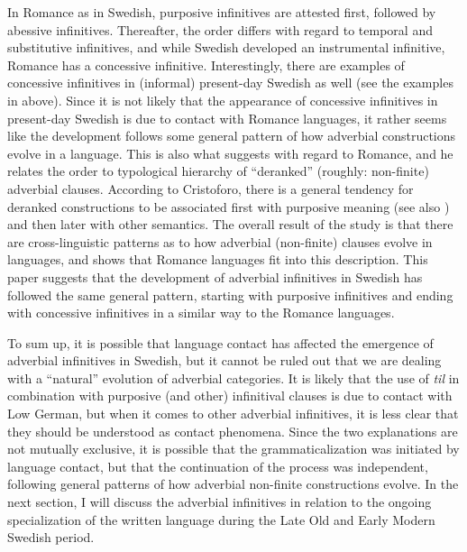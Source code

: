 \documentclass[output=paper]{langscibook}
\begin{document}
In Romance as in Swedish, purposive infinitives are attested first, followed by abessive infinitives. Thereafter, the order differs with regard to temporal and substitutive infinitives, and while Swedish developed an instrumental infinitive, Romance has a concessive infinitive. Interestingly, there are examples of concessive infinitives in (informal) present-day Swedish as well (see the examples in  above). Since it is not likely that the appearance of concessive infinitives in present-day Swedish is due to contact with Romance languages, it rather seems like the development follows some general pattern of how adverbial constructions evolve in a language. This is also what \citet{Schulte2007Prepositional, Schulte2007What} suggests with regard to Romance, and he relates the order to  typological hierarchy of “deranked” (roughly: non-finite) adverbial clauses. According to Cristoforo, there is a general tendency for deranked constructions to be associated first with purposive meaning (see also \citealt{Haspelmath1989}) and then later with other semantics. The overall result of the study is that there are cross-linguistic patterns as to how adverbial (non-finite) clauses evolve in languages, and \citet{Schulte2007Prepositional, Schulte2007What} shows that Romance languages fit into this description. This paper suggests that the development of adverbial infinitives in Swedish has followed the same general pattern, starting with purposive infinitives and ending with concessive infinitives in a similar way to the Romance languages.



To sum up, it is possible that language contact has affected the emergence of adverbial infinitives in Swedish, but it cannot be ruled out that we are dealing with a “natural” evolution of adverbial categories. It is likely that the use of \textit{til} in combination with purposive (and other) infinitival clauses is due to contact with Low German, but when it comes to other adverbial infinitives, it is less clear that they should be understood as contact phenomena. Since the two explanations are not mutually exclusive, it is possible that the grammaticalization was initiated by language contact, but that the continuation of the process was independent, following general patterns of how adverbial non-finite constructions evolve. In the next section, I will discuss the adverbial infinitives in relation to the ongoing specialization of the written language during the Late Old and Early Modern Swedish period. 
\end{document}
